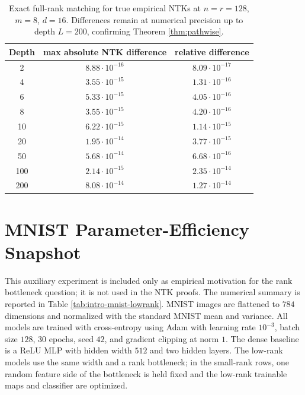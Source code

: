 \documentclass{article}
\begin{document}
\begin{table}[H]
\centering
\caption{Exact full-rank matching for true empirical NTKs at \(n=r=128\), \(m=8\), \(d=16\). Differences remain at numerical precision up to depth \(L=200\), confirming Theorem \ref{thm:pathwise}.}
\label{tab:full-rank-matching}
\begin{tabular}{ccc}
\toprule
Depth & max absolute NTK difference & relative difference \\
\midrule
2 & \(8.88\cdot10^{-16}\) & \(8.09\cdot10^{-17}\) \\
4 & \(3.55\cdot10^{-15}\) & \(1.31\cdot10^{-16}\) \\
6 & \(5.33\cdot10^{-15}\) & \(4.05\cdot10^{-16}\) \\
8 & \(3.55\cdot10^{-15}\) & \(4.20\cdot10^{-16}\) \\
10 & \(6.22\cdot10^{-15}\) & \(1.14\cdot10^{-15}\) \\
20 & \(1.95\cdot10^{-14}\) & \(3.77\cdot10^{-15}\) \\
50 & \(5.68\cdot10^{-14}\) & \(6.68\cdot10^{-16}\) \\
100 & \(2.14\cdot10^{-15}\) & \(2.35\cdot10^{-14}\) \\
200 & \(8.08\cdot10^{-14}\) & \(1.27\cdot10^{-14}\) \\
\bottomrule
\end{tabular}
\end{table}

\section{MNIST Parameter-Efficiency Snapshot}
\label{app:mnist-details}
This auxiliary experiment is included only as empirical motivation for the rank bottleneck question; it is not used in the NTK proofs. The numerical summary is reported in Table \ref{tab:intro-mnist-lowrank}. MNIST images are flattened to \(784\) dimensions and normalized with the standard MNIST mean and variance. All models are trained with cross-entropy using Adam with learning rate \(10^{-3}\), batch size \(128\), \(30\) epochs, seed \(42\), and gradient clipping at norm \(1\). The dense baseline is a ReLU MLP with hidden width \(512\) and two hidden layers. The low-rank models use the same width and a rank bottleneck; in the small-rank rows, one random feature side of the bottleneck is held fixed and the low-rank trainable maps and classifier are optimized.
\end{document}
